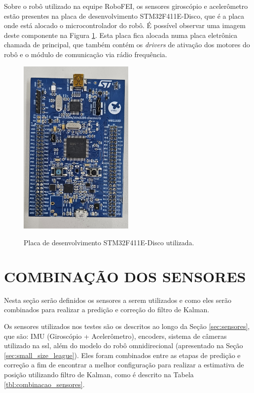 \documentclass[acronym, symbols, table]{fei}
\begin{document}
		Sobre o robô utilizado na equipe RoboFEI, os sensores giroscópio e acelerômetro estão presentes na placa de desenvolvimento STM32F411E-Disco, que é a placa onde está alocado o microcontrolador do robô. É possível observar uma imagem deste componente na Figura \ref{fig:stm32f411}. Esta placa fica alocada numa placa eletrônica chamada de principal, que também contém os \textit{drivers} de ativação dos motores do robô e o módulo de comunicação via rádio frequência.
		
		\begin{figure}[!htb]
			\centering
			\caption{Placa de desenvolvimento STM32F411E-Disco utilizada.}
			\includegraphics[width=0.5\textwidth]{stm32f411.jpg}
			\label{fig:stm32f411}
		\end{figure}
		
	\section{COMBINAÇÃO DOS SENSORES}\label{sec_metodologia_comb_sensores}
	
		Nesta seção serão definidos os sensores a serem utilizados e como eles serão combinados para realizar a predição e correção do filtro de Kalman.
		
		Os sensores utilizados nos testes são os descritos ao longo da Seção \ref{sec:sensores}, que são: IMU (Giroscópio + Acelerômetro), encoders, sistema de câmeras utilizado na \acrshort{ssl}, além do modelo do robô omnidirecional (apresentado na Seção \ref{sec:small_size_league}). Eles foram combinados entre as etapas de predição e correção a fim de encontrar a melhor configuração para realizar a estimativa de posição utilizando filtro de Kalman, como é descrito na Tabela \ref{tbl:combinacao_sensores}.
		
\end{document}
